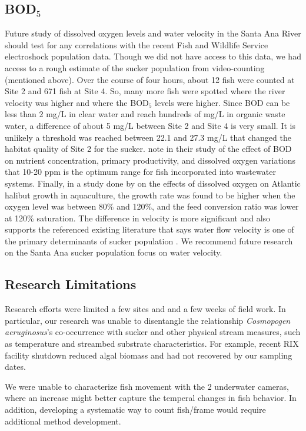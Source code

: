 \documentclass{article}\usepackage[]{graphicx}\usepackage[]{color}
\begin{document}
\subsection{BOD$_5$}
Future study of dissolved oxygen levels and water velocity in the Santa Ana River should test for any correlations with the recent Fish and Wildlife Service electroshock population data. Though we did not have access to this data, we had access to a rough estimate of the sucker population from video-counting (mentioned above). Over the course of four hours, about 12 fish were counted at Site 2 and 671 fish at Site 4. So, many more fish were spotted where the river velocity was higher and where the BOD$_5$ levels were higher. Since BOD can be less than 2 mg/L in clear water and reach hundreds of mg/L in organic waste water, a difference of about 5 mg/L between Site 2 and Site 4 is very small. It is unlikely a threshold was reached between 22.1 and 27.3 mg/L that changed the habitat quality of Site 2 for the sucker. \citet{chattopadhyay1988study} note in their study of the effect of BOD on nutrient concentration, primary productivity, and dissolved oxygen variations that 10-20 ppm is the optimum range for fish incorporated into wastewater systems. Finally, in a study done by \citet{mallya2007effects} on the effects of dissolved oxygen on Atlantic halibut growth in aquaculture, the growth rate was found to be higher when the oxygen level was between 80\% and 120\%, and the feed conversion ratio was lower at 120\% saturation. The difference in velocity is more significant and also supports the referenced existing literature that says water flow velocity is one of the primary determinants of sucker population \citep{evans2005draft, moyle2002inland, baskerville2012recovery}. We recommend future research on the Santa Ana sucker population focus on water velocity.

\subsection{Research Limitations}

Research efforts were limited a few sites and and a few weeks of field work. In particular, our research was unable to disentangle the relationship \emph{Cosmopogen aeruginosus}'s co-occurrence with sucker and other physical stream measures, such as temperature and streambed substrate characteristics. For example, recent RIX facility shutdown reduced algal biomass and had not recovered by our sampling dates. 

We were unable to characterize fish movement with the 2 underwater cameras, where an increase might better capture the temperal changes in fish behavior. In addition, developing a systematic way to count fish/frame would require additional method development.  
\end{document}
